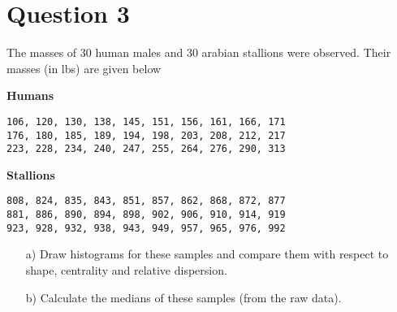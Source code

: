 \documentclass[]{article}
\begin{document}
\section*{Question 3}
The masses of 30 human males and 30 arabian stallions were observed. 
Their masses (in lbs) are given below

\textbf{Humans}
\begin{verbatim}
106, 120, 130, 138, 145, 151, 156, 161, 166, 171
176, 180, 185, 189, 194, 198, 203, 208, 212, 217
223, 228, 234, 240, 247, 255, 264, 276, 290, 313
\end{verbatim}

\textbf{Stallions}
\begin{verbatim}
808, 824, 835, 843, 851, 857, 862, 868, 872, 877
881, 886, 890, 894, 898, 902, 906, 910, 914, 919
923, 928, 932, 938, 943, 949, 957, 965, 976, 992
\end{verbatim}

\begin{itemize}
\item[a)] Draw histograms for these samples and compare them with respect to shape, centrality and relative dispersion. 
\item[b)] Calculate the medians of these samples (from the raw data).
\end{itemize}
\end{document}
